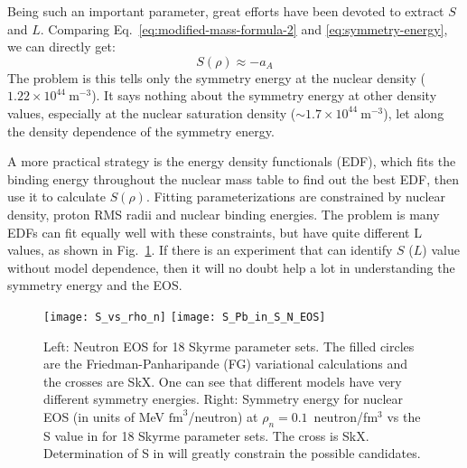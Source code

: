 Being such an important parameter, great efforts have been devoted to extract $S$ 
and $L$. Comparing Eq.~\ref{eq:modified-mass-formula-2} and \ref{eq:symmetry-energy},
we can directly get:
\begin{equation}
    S(\rho) \approx -a_A
\end{equation}
The problem is this tells only the symmetry energy at the nuclear density ($1.22 \times 10^{44}\ \mathrm{m}^{-3}$).
It says nothing about the symmetry energy at other density values, especially at the nuclear
saturation density ($\sim 1.7 \times 10^{44}\ \mathrm{m}^{-3}$), let along the density
dependence of the symmetry energy. 

A more practical strategy is the energy density functionals (EDF), which fits
the binding energy throughout the nuclear mass table to find out the best EDF,
then use it to calculate $S(\rho)$. Fitting parameterizations are constrained
by nuclear density, proton RMS radii and nuclear binding energies. 
The problem is many EDFs can fit equally well with these constraints, but have quite 
different L values, as shown in Fig.~\ref{fig:neutron_EOS}.
If there is an experiment that can identify $S$ ($L$) value without model dependence, 
then it will no doubt help a lot in understanding the symmetry energy and the EOS.
\begin{figure}[H]
    \texttt{[image: S\_vs\_rho\_n]}
    \hfill
    \texttt{[image: S\_Pb\_in\_S\_N\_EOS]}
    \caption{Left: Neutron EOS for 18 Skyrme parameter sets. The filled circles are
    the Friedman-Panharipande (FG) variational calculations and the crosses are SkX. 
    \cite{PhysRevSTAB.7.042802}
    One can see that different models have very different symmetry energies.
    Right: Symmetry energy for nuclear EOS (in units of MeV $\mathrm{fm}^3$/neutron) 
    at $\rho_n = 0.1$~neutron/fm${}^3$ vs the S value in \Pb for 18 Skyrme parameter sets. 
    The cross is SkX. Determination of S in \Pb will greatly constrain the 
    possible candidates.
    }
    \label{fig:neutron_EOS}
\end{figure}


